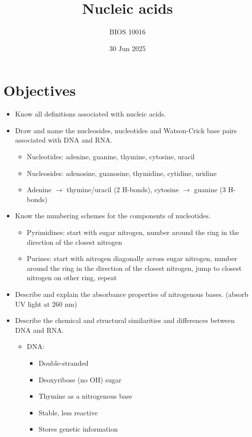 \documentclass[letterpaper, 12pt]{article}
\title{Nucleic acids}
\author{BIOS 10016}
\date{30 Jun 2025}
\begin{document}
\maketitle

\section*{Objectives}

\begin{itemize}
\item Know all definitions associated with nucleic acids.
\item Draw and name the nucleosides, nucleotides and Watson-Crick base pairs associated with DNA and RNA.
\begin{itemize}
\item Nucleotides: adenine, guanine, thymine, cytosine, uracil
\item Nucleosides: adenosine, guanosine, thymidine, cytidine, uridine
\item Adenine $\to$ thymine/uracil (2 H-bonds), cytosine $\to$ guanine (3 H-bonds)
\end{itemize}
\item Know the numbering schemes for the components of nucleotides.
\begin{itemize}
\item Pyrimidines: start with sugar nitrogen, number around the ring in the direction of the closest nitrogen
\item Purines: start with nitrogen diagonally across sugar nitrogen, number around the ring in the direction of the closest nitrogen, jump to closest nitrogen on other ring, repeat
\end{itemize}
\item Describe and explain the absorbance properties of nitrogenous bases. (absorb UV light at 260 nm)
\item Describe the chemical and structural similarities and differences between DNA and RNA.
\begin{itemize}
\item DNA:
\begin{itemize}
\item Double-stranded
\item Deoxyribose (no OH) sugar
\item Thymine as a nitrogenous base
\item Stable, less reactive
\item Stores genetic information
\end{itemize}

\end{itemize}
\end{itemize}
\end{document}
